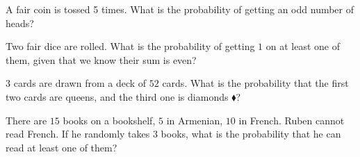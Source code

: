 \medskip


\begin{problem}
A fair coin is tossed 5 times. What is the probability of getting an odd number of heads?
\end{problem}

\medskip



        
\begin{problem}
Two fair dice are rolled. What is the probability of getting $1$ on at least one of them, given that we know their sum is even?
\end{problem}
\medskip

\begin{problem}
$3$ cards are drawn from a deck of $52$ cards. What is the probability that the first two cards are queens, and the third one is diamonds {\color{red}$\blacklozenge$}?
\end{problem}

\medskip 



\begin{problem}
There are $15$ books on a bookshelf, $5$ in Armenian, $10$ in French. Ruben cannot read French. If he randomly takes $3$ books, what is the probability that he can read at least one of them?
\end{problem}



% 
% 
    
% 
